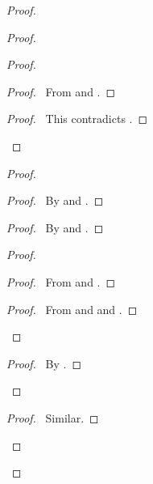 \documentclass{report}
\let\qed\relax
\theoremstyle{definition}
\begin{document}
\begin{proof}
\begin{proof}
\begin{proof}
      \begin{proof}
        \pf\ From  and .
      \end{proof}
      \qedstep
      \begin{proof}
        \pf\ This contradicts .
      \end{proof}
    \end{proof}
    \begin{proof}
      \begin{proof}
        \pf\ By  and .
      \end{proof}
      \begin{proof}
        \pf\ By  and .
      \end{proof}
      \begin{proof}
        \begin{proof}
          \pf\ From  and .
        \end{proof}
        \qedstep
        \begin{proof}
          \pf\ From  and  and .
        \end{proof}
      \end{proof}
      \qedstep
      \begin{proof}
        \pf\ By .
      \end{proof}
    \end{proof}
    \begin{proof}
      \pf\ Similar.
    \end{proof}
  \end{proof}
  \qed
\end{proof}
\end{document}
